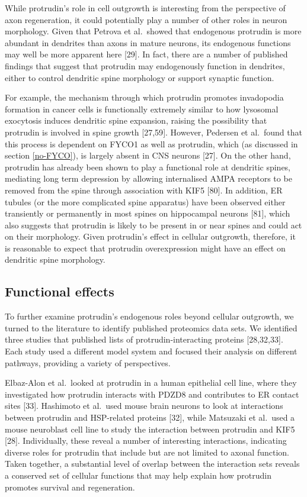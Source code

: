 \documentclass[
  12pt,
  a4paper,
]{book}
\begin{document}
While protrudin's role in cell outgrowth is interesting from the perspective of axon regeneration, it could potentially play a number of other roles in neuron morphology. Given that Petrova et al.~showed that endogenous protrudin is more abundant in dendrites than axons in mature neurons, its endogenous functions may well be more apparent here {[}29{]}. In fact, there are a number of published findings that suggest that protrudin may endogenously function in dendrites, either to control dendritic spine morphology or support synaptic function.

For example, the mechanism through which protrudin promotes invadopodia formation in cancer cells is functionally extremely similar to how lysosomal exocytosis induces dendritic spine expansion, raising the possibility that protrudin is involved in spine growth {[}27,59{]}. However, Pedersen et al.~found that this process is dependent on FYCO1 as well as protrudin, which (as discussed in section \ref{no-FYCO}), is largely absent in CNS neurons {[}27{]}. On the other hand, protrudin has already been shown to play a functional role at dendritic spines, mediating long term depression by allowing internalised AMPA receptors to be removed from the spine through association with KIF5 {[}80{]}. In addition, ER tubules (or the more complicated spine apparatus) have been observed either transiently or permanently in most spines on hippocampal neurons {[}81{]}, which also suggests that protrudin is likely to be present in or near spines and could act on their morphology. Given protrudin's effect in cellular outgrowth, therefore, it is reasonable to expect that protrudin overexpression might have an effect on dendritic spine morphology.

\hypertarget{functional-effects}{%
\subsection{Functional effects}\label{functional-effects}}

To further examine protrudin's endogenous roles beyond cellular outgrowth, we turned to the literature to identify published proteomics data sets. We identified three studies that published lists of protrudin-interacting proteins {[}28,32,33{]}. Each study used a different model system and focused their analysis on different pathways, providing a variety of perspectives.

Elbaz-Alon et al.~looked at protrudin in a human epithelial cell line, where they investigated how protrudin interacts with PDZD8 and contributes to ER contact sites {[}33{]}. Hashimoto et al.~used mouse brain neurons to look at interactions between protrudin and HSP-related proteins {[}32{]}, while Matsuzaki et al.~used a mouse neuroblast cell line to study the interaction between protrudin and KIF5 {[}28{]}. Individually, these reveal a number of interesting interactions, indicating diverse roles for protrudin that include but are not limited to axonal function. Taken together, a substantial level of overlap between the interaction sets reveals a conserved set of cellular functions that may help explain how protrudin promotes survival and regeneration.
\end{document}
